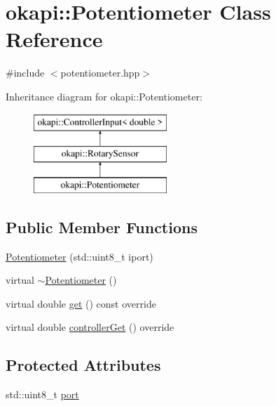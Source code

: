 \hypertarget{classokapi_1_1Potentiometer}{}\section{okapi\+::Potentiometer Class Reference}
\label{classokapi_1_1Potentiometer}


{\ttfamily \#include $<$potentiometer.\+hpp$>$}

Inheritance diagram for okapi\+::Potentiometer\+:\begin{figure}[H]
\begin{center}
\leavevmode
\includegraphics[height=3.000000cm]{classokapi_1_1Potentiometer}
\end{center}
\end{figure}
\subsection*{Public Member Functions}
\begin{DoxyCompactItemize}
\item 
\mbox{\hyperlink{classokapi_1_1Potentiometer_a1e528bdba36d41f3698f3f451d2a2510}{Potentiometer}} (std\+::uint8\+\_\+t iport)
\item 
virtual \mbox{\hyperlink{classokapi_1_1Potentiometer_a60553115f275e91469a02a7290a9f33c}{$\sim$\+Potentiometer}} ()
\item 
virtual double \mbox{\hyperlink{classokapi_1_1Potentiometer_ad81adf2cb10b830272e9a553b668fc4b}{get}} () const override
\item 
virtual double \mbox{\hyperlink{classokapi_1_1Potentiometer_a8498720272d220e06ade0efbed634d3e}{controller\+Get}} () override
\end{DoxyCompactItemize}
\subsection*{Protected Attributes}
\begin{DoxyCompactItemize}
\item 
std\+::uint8\+\_\+t \mbox{\hyperlink{classokapi_1_1Potentiometer_ade12a9942bf6fd83f43e38f22ed210d3}{port}}
\end{DoxyCompactItemize}



